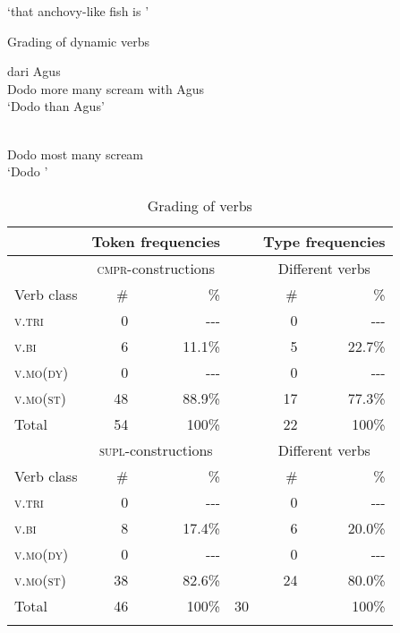 ‘that anchovy-like fish is ’
\begin{styleExampleTitle}
Grading of  dynamic verbs
\end{styleExampleTitle}

\ea
\label{Example_5.126}
 {} {} {} {dari} {Agus}\\ %
 Dodo  more  many  scream  with  Agus\\
\glt 
‘Dodo  than Agus’ \textstyleExampleSource{[Elicited BR130221.025]}
\z

\ea
\label{Example_5.127}
 {} {} {}\\ %
 Dodo  most  many  scream\\
\glt 
‘Dodo ’ \textstyleExampleSource{[Elicited BR130221.030]}
\z



\begin{table}[b]
\caption{Grading of verbs}\label{Table_5.18}
\begin{tabular}{l*{5}{r}}
\lsptoprule
& \multicolumn{2}{c}{ Token frequencies} &  & \multicolumn{2}{c}{ Type frequencies}\\
\midrule
 & \multicolumn{2}{c}{ \textsc{cmpr}{}-constructions} &  & \multicolumn{2}{c}{ Different verbs}\\
Verb class &  \# &  \%  & &  \# &  \%\\
\textsc{v.tri} &  0 &  {}-{}-{}- & &   0 &  {}-{}-{}-\\
\textsc{v.bi} &  6 &  11.1\% &  &  5 &  22.7\%\\
\textsc{v.mo}(\textsc{dy}) &  0 &  {}-{}-{}- & &   0 &  {}-{}-{}-\\
\textsc{v.mo}(\textsc{st}) &  48 &  88.9\% &  &  17 &  77.3\%\\
\midrule
Total &  54 &  100\% &  &  22 &  100\%\\
\midrule
& \multicolumn{2}{c}{ \textsc{supl}{}-constructions} &  & \multicolumn{2}{c}{ Different verbs}\\
Verb class &  \# &  \% &  &  \# &  \%\\
\textsc{v.tri} &  0 &  {}-{}-{}- & &   0 &  {}-{}-{}-\\
\textsc{v.bi} &  8 &  17.4\% &  &  6 &  20.0\%\\
\textsc{v.mo}(\textsc{dy}) &  0 &  {}-{}-{}- &  &  0 &  {}-{}-{}-\\
\textsc{v.mo}(\textsc{st}) &  38 &  82.6\% & &   24 &  80.0\%\\
\midrule
Total &  46 &  100\% &  30 &  &  100\%\\
\lspbottomrule
\end{tabular}
\end{table}

